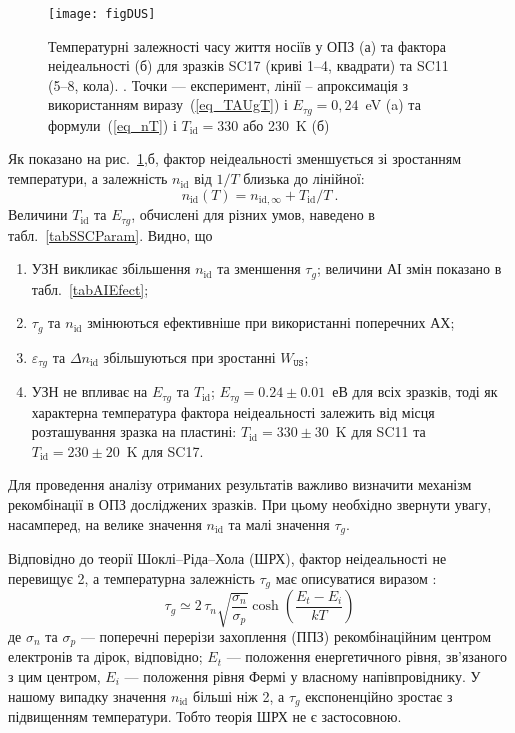 \begin{figure}
\center
\texttt{[image: figDUS]}%
\caption{\label{figDUS}
Температурні залежності часу життя носіїв у ОПЗ (а) та фактора неідеальності (б)
для зразків SC17 (криві 1--4, квадрати) та SC11 (5--8, кола).
\FigCaptionSSC.
Точки --- експеримент,
лінії -- апроксимація з використанням виразу~(\ref{eq_TAUgT}) і $E_{\tau g}=0,24$~eV (a) та
формули~(\ref{eq_nT}) і $T_\mathrm{id}=330$ або 230~K (б)
}%
\end{figure}

Як показано на рис.~\ref{figDUS},б, фактор неідеальності зменшується зі зростанням температури, а залежність
$n_{\mathrm{id}}$ від $1/T$  близька до лінійної:
\begin{equation}
\label{eq_nT}
    n_{\mathrm{id}}(T)=n_{\mathrm{id},\infty}+T_{\mathrm{id}}/T\:.
\end{equation}
Величини $T_{\mathrm{id}}$ та $E_{\tau g}$, обчислені для різних умов, наведено в табл.~\ref{tabSSCParam}.
Видно, що

\begin{enumerate}[label=\asbuk*),leftmargin=0em,itemindent=1.5em]
\item УЗН викликає збільшення $n_\mathrm{id}$ та зменшення $\tau_{g}$;
   величини АІ змін показано в табл.~\ref{tabAIEfect};
\item $\tau_{g}$ та $n_\mathrm{id}$ змінюються ефективніше при використанні поперечних АХ;
\item $\varepsilon_{\tau g}$ та $\Delta n_\mathrm{id}$ збільшуються при зростанні $W_{\mathtt{US}}$;
\item УЗН не впливає на $E_{\tau g}$ та $T_\mathrm{id}$;
 $E_{\tau g}=0.24\pm0.01$~еВ для всіх зразків,
 тоді як характерна температура фактора неідеальності залежить від місця розташування зразка на пластині: $T_\mathrm{id}=330\pm30$~K для SC11 та $T_\mathrm{id}=230\pm20$~K для SC17.
\end{enumerate}

Для проведення аналізу отриманих результатів важливо визначити механізм рекомбінації в ОПЗ досліджених зразків.
При цьому необхідно звернути увагу, насамперед, на велике значення  $n_{\mathrm{id}}$ та малі значення $\tau_g$.

Відповідно до теорії Шоклі--Ріда--Хола (ШРХ),
фактор неідеальності не перевищує 2, а температурна залежність $\tau_g$ має описуватися виразом \cite{TAUg:Schroder,TAUg:Aharoni}:
\begin{equation}
  \tau_g\simeq2\,\tau_n\sqrt{\frac{\sigma_n}{\sigma_p}}\cosh\left(\frac{E_t-E_i}{kT}\right)
\end{equation}
де
$\sigma_n$ та $\sigma_p$ --- поперечні перерізи захоплення (ППЗ) рекомбінаційним центром електронів та дірок, відповідно;
$E_t$ --- положення енергетичного рівня, зв'язаного з цим центром,
$E_i$  --- положення рівня Фермі у власному напівпровіднику.
У нашому випадку значення $n_{\mathrm{id}}$ більші ніж 2,
а $\tau_g$ експоненційно зростає з підвищенням температури.
Тобто теорія ШРХ не є застосовною.

